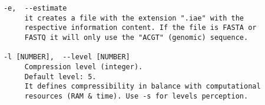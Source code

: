 \begin{lstlisting}
      -e,  --estimate                                                   
           it creates a file with the extension ".iae" with the       
           respective information content. If the file is FASTA or      
           FASTQ it will only use the "ACGT" (genomic) sequence.      
                                                                        
      -l [NUMBER],  --level [NUMBER]                                    
           Compression level (integer).                                 
           Default level: 5.                                           
           It defines compressibility in balance with computational     
           resources (RAM & time). Use -s for levels perception.        
                                                                        

\end{lstlisting}
